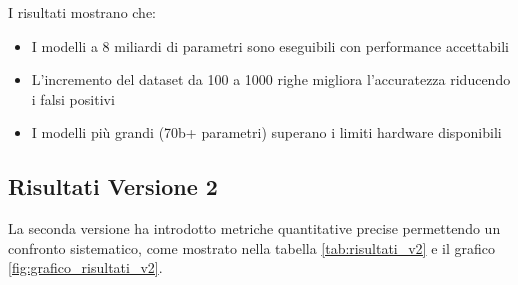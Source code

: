 \documentclass[12pt]{report}
\begin{document}
I risultati mostrano che:
\begin{itemize}
    \item I modelli a 8 miliardi di parametri sono eseguibili con performance accettabili
    \item L'incremento del dataset da 100 a 1000 righe migliora l'accuratezza riducendo i falsi positivi
    \item I modelli più grandi (70b+ parametri) superano i limiti hardware disponibili
\end{itemize}

\subsection{Risultati Versione 2}
\label{subsec:risultati_v2}

La seconda versione ha introdotto metriche quantitative precise permettendo un confronto sistematico, come mostrato nella tabella \ref{tab:risultati_v2} e il grafico \ref{fig:grafico_risultati_v2}.
\end{document}
